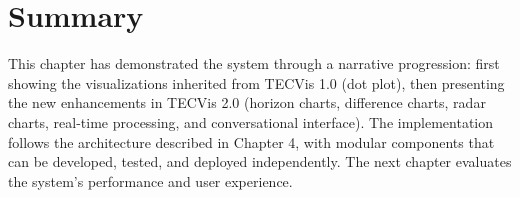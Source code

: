 
\section{Summary}

This chapter has demonstrated the system through a narrative progression: first showing the visualizations inherited from TECVis 1.0 (dot plot), then presenting the new enhancements in TECVis 2.0 (horizon charts, difference charts, radar charts, real-time processing, and conversational interface). The implementation follows the architecture described in Chapter 4, with modular components that can be developed, tested, and deployed independently. The next chapter evaluates the system's performance and user experience.

